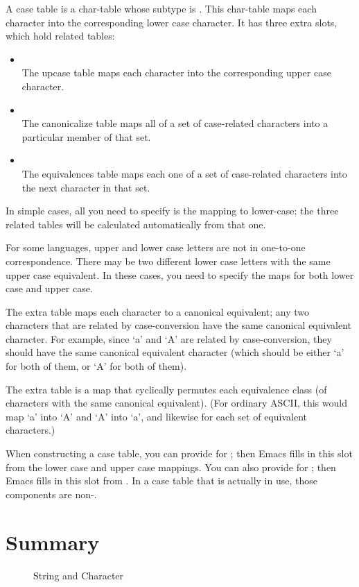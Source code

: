 A case table is a char-table whose subtype is .
This char-table maps each character into the corresponding lower case character.
It has three extra slots, which hold related tables:
\begin{itemize}
\item {}\\
  The upcase table maps each character into the corresponding upper case character.
\item {}\\
  The canonicalize table maps all of a set of case-related characters into a particular member of that set.
\item {}\\
  The equivalences table maps each one of a set of case-related characters into the next character in that set.
\end{itemize}


In simple cases, all you need to specify is the mapping to lower-case; the three related tables will be calculated automatically from that one.


For some languages, upper and lower case letters are not in one-to-one correspondence.
There may be two different lower case letters with the same upper case equivalent.
In these cases, you need to specify the maps for both lower case and upper case.


The extra table  maps each character to a canonical equivalent; any two characters that are related by case-conversion have the same canonical equivalent character.
For example, since ‘a’ and ‘A’ are related by case-conversion, they should have the same canonical equivalent character (which should be either ‘a’ for both of them, or ‘A’ for both of them).

The extra table  is a map that cyclically permutes each equivalence class (of characters with the same canonical equivalent).
(For ordinary ASCII, this would map ‘a’ into ‘A’ and ‘A’ into ‘a’, and likewise for each set of equivalent characters.)



When constructing a case table, you can provide  for ; then Emacs fills in this slot from the lower case and upper case mappings.
You can also provide  for ; then Emacs fills in this slot from .
In a case table that is actually in use, those components are non-.


\section{Summary}
\label{sec:summary-2}

\begin{figure}[H]
  \centering
  \caption{String and Character}
\end{figure}
